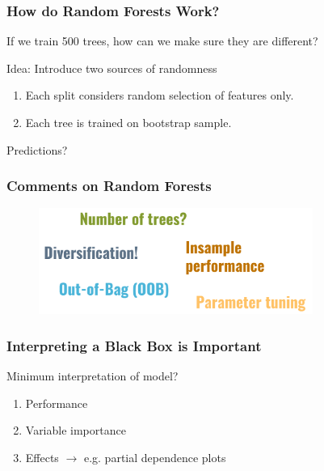 \documentclass[
    utf8,
    aspectratio=169
]{beamer}  %
\begin{document}
\begin{frame}
	\frametitle{How do Random Forests Work?}
	If we train 500 trees, how can we make sure they are different? 
	
	\vfill
	
	\begin{block}{Idea: Introduce two sources of randomness}
		\begin{enumerate}
			\item Each split considers random selection of features only.
			\item Each tree is trained on bootstrap sample.
		\end{enumerate}
	\end{block}

	\vfill

	Predictions? 
\end{frame}

\begin{frame}
	\frametitle{Comments on Random Forests}
	\begin{figure}
		\includegraphics[width=0.8\textwidth]{pics/rf_words.png}
	\end{figure}
	\begin{example}
	\end{example}
\end{frame}

\begin{frame}
	\frametitle{Interpreting a Black Box is Important}
	\begin{block}{Minimum interpretation of model?}
		\begin{enumerate}
			\item Performance
			\item Variable importance
			\item Effects $\rightarrow$ e.g. partial dependence plots
		\end{enumerate}
	\end{block}

	\vfill
	
	\begin{example}
	\end{example}
\end{frame}
\end{document}
